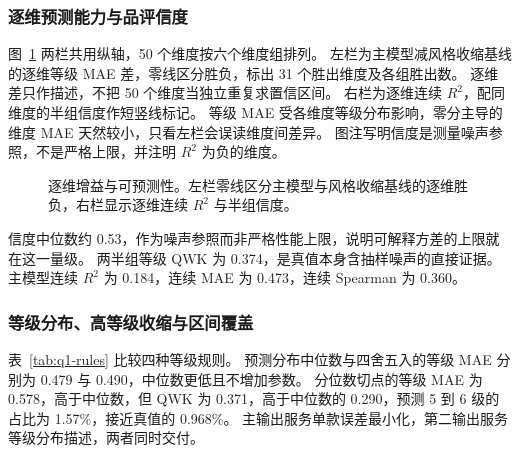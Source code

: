 \subsubsection{逐维预测能力与品评信度}

图~\ref{fig:q1-dim} 两栏共用纵轴，50 个维度按六个维度组排列。
左栏为主模型减风格收缩基线的逐维等级 MAE 差，零线区分胜负，标出 31 个胜出维度及各组胜出数。
逐维差只作描述，不把 50 个维度当独立重复求置信区间。
右栏为逐维连续 $R^2$，配同维度的半组信度作短竖线标记。
等级 MAE 受各维度等级分布影响，零分主导的维度 MAE 天然较小，只看左栏会误读维度间差异。
图注写明信度是测量噪声参照，不是严格上限，并注明 $R^2$ 为负的维度。

\begin{figure}[htbp]\centering
{}
\caption{逐维增益与可预测性。左栏零线区分主模型与风格收缩基线的逐维胜负，右栏显示逐维连续 $R^2$ 与半组信度。}
\label{fig:q1-dim}
\end{figure}

信度中位数约 0.53，作为噪声参照而非严格性能上限，说明可解释方差的上限就在这一量级。
两半组等级 QWK 为 0.374，是真值本身含抽样噪声的直接证据。
主模型连续 $R^2$ 为 0.184，连续 MAE 为 0.473，连续 Spearman 为 0.360。

\subsubsection{等级分布、高等级收缩与区间覆盖}

表~\ref{tab:q1-rules} 比较四种等级规则。
预测分布中位数与四舍五入的等级 MAE 分别为 0.479 与 0.490，中位数更低且不增加参数。
分位数切点的等级 MAE 为 0.578，高于中位数，但 QWK 为 0.371，高于中位数的 0.290，预测 5 到 6 级的占比为 1.57\%，接近真值的 0.968\%。
主输出服务单款误差最小化，第二输出服务等级分布描述，两者同时交付。

\begin{table}[htbp]
\centering\small
\caption{问题一等级规则比较}
\label{tab:q1-rules}
\end{table}

